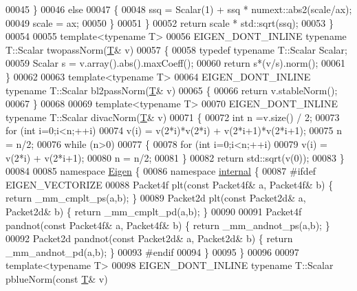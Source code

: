 \begin{DoxyCode}
00045     \}
00046     \textcolor{keywordflow}{else}
00047     \{
00048       ssq = Scalar(1) + ssq * numext::abs2(scale/ax);
00049       scale = ax;
00050     \}
00051   \}
00052   \textcolor{keywordflow}{return} scale * std::sqrt(ssq);
00053 \}
00054 
00055 \textcolor{keyword}{template}<\textcolor{keyword}{typename} T>
00056 EIGEN\_DONT\_INLINE \textcolor{keyword}{typename} T::Scalar twopassNorm(\hyperlink{group___sparse_core___module}{T}& v)
00057 \{
00058   \textcolor{keyword}{typedef} \textcolor{keyword}{typename} T::Scalar Scalar;
00059   Scalar s = v.array().abs().maxCoeff();
00060   \textcolor{keywordflow}{return} s*(v/s).norm();
00061 \}
00062 
00063 \textcolor{keyword}{template}<\textcolor{keyword}{typename} T>
00064 EIGEN\_DONT\_INLINE \textcolor{keyword}{typename} T::Scalar bl2passNorm(\hyperlink{group___sparse_core___module}{T}& v)
00065 \{
00066   \textcolor{keywordflow}{return} v.stableNorm();
00067 \}
00068 
00069 \textcolor{keyword}{template}<\textcolor{keyword}{typename} T>
00070 EIGEN\_DONT\_INLINE \textcolor{keyword}{typename} T::Scalar divacNorm(\hyperlink{group___sparse_core___module}{T}& v)
00071 \{
00072   \textcolor{keywordtype}{int} n =v.size() / 2;
00073   \textcolor{keywordflow}{for} (\textcolor{keywordtype}{int} i=0;i<n;++i)
00074     v(i) = v(2*i)*v(2*i) + v(2*i+1)*v(2*i+1);
00075   n = n/2;
00076   \textcolor{keywordflow}{while} (n>0)
00077   \{
00078     \textcolor{keywordflow}{for} (\textcolor{keywordtype}{int} i=0;i<n;++i)
00079       v(i) = v(2*i) + v(2*i+1);
00080     n = n/2;
00081   \}
00082   \textcolor{keywordflow}{return} std::sqrt(v(0));
00083 \}
00084 
00085 \textcolor{keyword}{namespace }\hyperlink{namespace_eigen}{Eigen} \{
00086 \textcolor{keyword}{namespace }\hyperlink{namespaceinternal}{internal} \{
00087 \textcolor{preprocessor}{#ifdef EIGEN\_VECTORIZE}
00088 Packet4f plt(\textcolor{keyword}{const} Packet4f& a, Packet4f& b) \{ \textcolor{keywordflow}{return} \_mm\_cmplt\_ps(a,b); \}
00089 Packet2d plt(\textcolor{keyword}{const} Packet2d& a, Packet2d& b) \{ \textcolor{keywordflow}{return} \_mm\_cmplt\_pd(a,b); \}
00090 
00091 Packet4f pandnot(\textcolor{keyword}{const} Packet4f& a, Packet4f& b) \{ \textcolor{keywordflow}{return} \_mm\_andnot\_ps(a,b); \}
00092 Packet2d pandnot(\textcolor{keyword}{const} Packet2d& a, Packet2d& b) \{ \textcolor{keywordflow}{return} \_mm\_andnot\_pd(a,b); \}
00093 \textcolor{preprocessor}{#endif}
00094 \}
00095 \}
00096 
00097 \textcolor{keyword}{template}<\textcolor{keyword}{typename} T>
00098 EIGEN\_DONT\_INLINE \textcolor{keyword}{typename} T::Scalar pblueNorm(\textcolor{keyword}{const} \hyperlink{group___sparse_core___module}{T}& v)

\end{DoxyCode}
